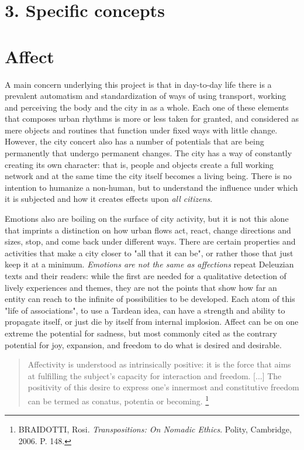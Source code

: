 \section*{3. Specific concepts}

\section*{Affect}

A main concern underlying this project is that in day-to-day life there is a prevalent automatism and standardization of ways of using transport, working and perceiving the body and the city in as a whole. Each one of these elements that composes urban rhythms is more or less taken for granted, and considered as mere objects and routines that function under fixed ways with little change. However, the city concert also has a number  of potentials that are being permanently  that undergo permanent changes. The city has a way of constantly creating its own character: that is, people and objects create a full working network and at the same time the city itself becomes a living being. There is no intention to humanize a non-human, but to understand the influence under which it is subjected and how it creates effects upon \textit{all citizens}.

Emotions also are boiling on the surface of city activity, but it is not this alone that imprints a distinction on how urban flows act, react, change directions and sizes, stop, and come back under different ways. There are certain properties and activities that make a city closer to "all that it can be", or rather those that just keep it at a minimum. \textit{Emotions are not the same as affections} repeat Deleuzian texts and their readers: while the first are needed for a qualitative detection of lively experiences and themes, they are not the points that show how far an entity can reach to the infinite of possibilities to be developed. Each atom of this "life of associations", to use a Tardean idea, can have a strength and ability to propagate itself, or just die by itself from internal implosion. Affect can be on one extreme the potential for sadness, but most commonly cited as the contrary potential for joy, expansion, and freedom to do what is desired and desirable.

\begin{quote}
 Affectivity is understood as intrinsically positive: it is the force that aims at fulfilling the subject's capacity for interaction and freedom. [...] The positivity of this desire to express one's innermost and constitutive freedom can be termed as conatus, potentia or becoming.%
 \footnote{BRAIDOTTI, Rosi. \textit{Transpositions: On Nomadic Ethics}. Polity, Cambridge, 2006. P. 148.}
\end{quote}

